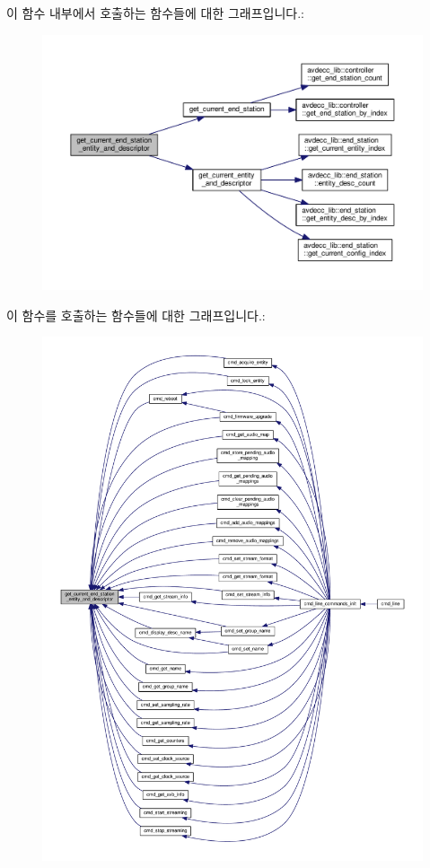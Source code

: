 이 함수 내부에서 호출하는 함수들에 대한 그래프입니다.\+:
\nopagebreak
\begin{figure}[H]
\begin{center}
\leavevmode
\includegraphics[width=350pt]{classcmd__line_ac2d4611fba7db03d436a2e3c1e64828e_cgraph}
\end{center}
\end{figure}




이 함수를 호출하는 함수들에 대한 그래프입니다.\+:
\nopagebreak
\begin{figure}[H]
\begin{center}
\leavevmode
\includegraphics[width=350pt]{classcmd__line_ac2d4611fba7db03d436a2e3c1e64828e_icgraph}
\end{center}
\end{figure}


